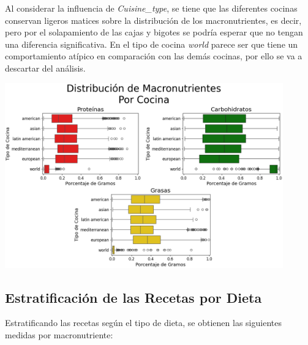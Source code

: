 \documentclass[12pt,a4paper]{article}
\begin{document}
{{            Al considerar la influencia de \emph{Cuisine\_type}, se tiene que las diferentes 
            cocinas conservan ligeros matices sobre la distribución de los macronutrientes, es 
            decir, pero por el solapamiento de las cajas y bigotes se podría esperar que no tengan 
            una diferencia significativa. En el tipo de cocina \emph{world} parece ser que tiene 
            un comportamiento atípico en comparación con las demás cocinas, por ello se va a 
            descartar del análisis.

            \begin{center}
                \includegraphics[width=0.9\textwidth]{Resources/EDA/VisionGeneral_2.png}
            \end{center}
        }

        \subsection{Estratificación de las Recetas por Dieta}
        {
            Estratificando las recetas según el tipo de dieta, se obtienen las siguientes 
            medidas por macronutriente:

}}
\end{document}
